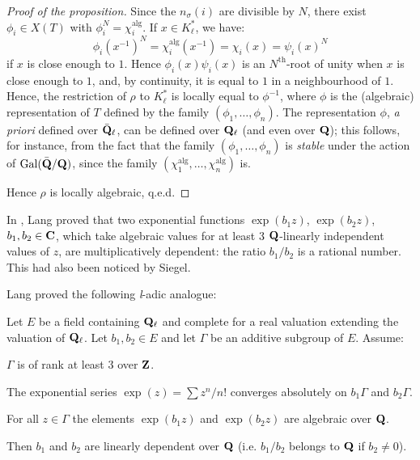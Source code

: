 \begin{proof}[Proof of the proposition]
Since the $n_\sigma(i)$ are divisible by $N$, there exist
$\phi_i\in X(T)$ with $\phi_i^N=\chi_i^{\mathrm{alg}}$.  If
$x\in K_\ell^*$, we have:
\[
\phi_i(x^{-1})^N=\chi_i^{\mathrm{alg}}(x^{-1})=\chi_i(x)=\psi_i(x)^N
\]
if $x$ is close enough to $1$.  Hence $\phi_i(x)\psi_i(x)$ is an
$N^{\mathrm{th}}$-root of unity when $x$ is close enough to $1$,
and, by continuity, it is equal to $1$ in a neighbourhood of $1$.
Hence, the restriction of $\rho$ to $K_\ell^*$ is locally equal to
$\phi^{-1}$, where $\phi$ is the (algebraic) representation of $T$
defined by the family $(\phi_1,\ldots,\phi_n)$.  The representation
$\phi$, \emph{a priori} defined over $\bar{\mathbf{Q}}_\ell$, can be defined
over $\mathbf{Q}_\ell$ (and even over $\mathbf{Q}$); this follows, for instance,
from the fact that the family $(\phi_1,\ldots,\phi_n)$ is
\emph{stable} under the action of $\mathrm{Gal}(\bar{\mathbf{Q}}/\mathbf{Q})$, since the
family $(\chi_1^{\mathrm{alg}},\ldots,\chi_n^{\mathrm{alg}})$ is.

Hence $\rho$ is locally algebraic, q.e.d.
\end{proof}


In \cite{lang-transc}, Lang proved that two exponential functions
$\exp(b_1z)$, $\exp(b_2z)$, $b_1,b_2\in\mathbf{C}$, which take algebraic
values for at least 3 $\mathbf{Q}$-linearly independent values of $z$, are
multiplicatively dependent: the ratio $b_1/b_2$ is a rational
number.  This had also been noticed by Siegel.

Lang proved the following \textit{l}-adic analogue:

\begin{proposition}[1]\label{prop:III.3.3.1}
Let $E$ be a field containing $\mathbf{Q}_\ell$ and complete for a real
valuation extending the valuation of $\mathbf{Q}_\ell$.  Let $b_1,b_2\in E$
and let $\Gamma$ be an additive subgroup of $E$.  Assume:
\begin{alist}[label=(\arabic*)]
\item[(1.)] $\Gamma$ is of rank at least 3 over $\mathbf{Z}$.
\item The exponential series $\exp(z)=\sum z^n/n!$ converges
absolutely on $b_1\Gamma$ and $b_2\Gamma$.
\item For all $z\in\Gamma$ the elements $\exp(b_1z)$ and
$\exp(b_2z)$ are algebraic over $\mathbf{Q}$.
\end{alist}
Then $b_1$ and $b_2$ are linearly dependent over $\mathbf{Q}$ (i.e.
$b_1/b_2$ belongs to $\mathbf{Q}$ if $b_2\neq 0$).
\end{proposition}

